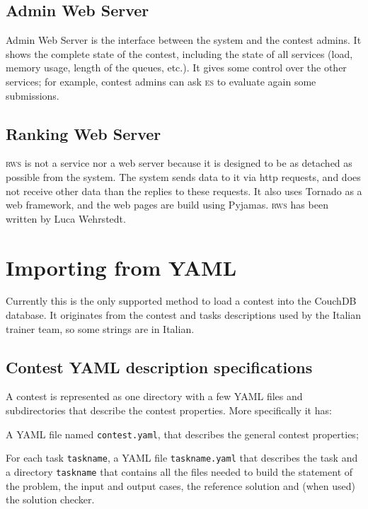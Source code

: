 \documentclass[a4paper,8pt]{amsart}
\newcommand{\ES}{\textsc{es}}
\newcommand{\RWS}{\textsc{rws}}
\newenvironment{squishlist}{%
  \begin{list}{\textbullet}%
    { \setlength{\itemsep}{0pt}%
      \setlength{\parsep}{3pt}%
      \setlength{\topsep}{3pt}%
      \setlength{\partopsep}{0pt}%
      \setlength{\leftmargin}{1.5em}%
      \setlength{\labelwidth}{1em}%
      \setlength{\labelsep}{0.5em} }%
}{\end{list}}
\newcommand{\id}[1]{\texttt{#1}}
\newcommand{\file}[1]{\texttt{#1}}
\begin{document}
\begin{multicols}{2}
  \subsection{Admin Web Server}

  Admin Web Server is the interface between the system and the
  contest admins. It shows the complete state of the contest,
  including the state of all services (load, memory usage, length of
  the queues, etc.). It gives some control over the other services;
  for example, contest admins can ask \ES{} to evaluate again some
  submissions.

  \subsection{Ranking Web Server}

  \RWS{} is not a service nor a web server because it is designed to
  be as detached as possible from the system. The system sends data to
  it via http requests, and does not receive other data than the
  replies to these requests. It also uses Tornado as a web framework,
  and the web pages are build using Pyjamas. \RWS{} has been written
  by Luca Wehrstedt.

  \section{Importing from YAML}

  Currently this is the only supported method to load a contest into
  the CouchDB database. It originates from the contest and tasks
  descriptions used by the Italian trainer team, so some strings are
  in Italian.

  \subsection{Contest YAML description specifications}

  A contest is represented as one directory with a few YAML files and
  subdirectories that describe the contest properties. More
  specifically it has:

  \begin{squishlist}

  \item A YAML file named \file{contest.yaml}, that describes the
    general contest properties;

  \item For each task \id{taskname}, a YAML file \file{taskname.yaml}
    that describes the task and a directory \file{taskname} that
    contains all the files needed to build the statement of the
    problem, the input and output cases, the reference solution and
    (when used) the solution checker.


\end{squishlist}
\end{multicols}
\end{document}

